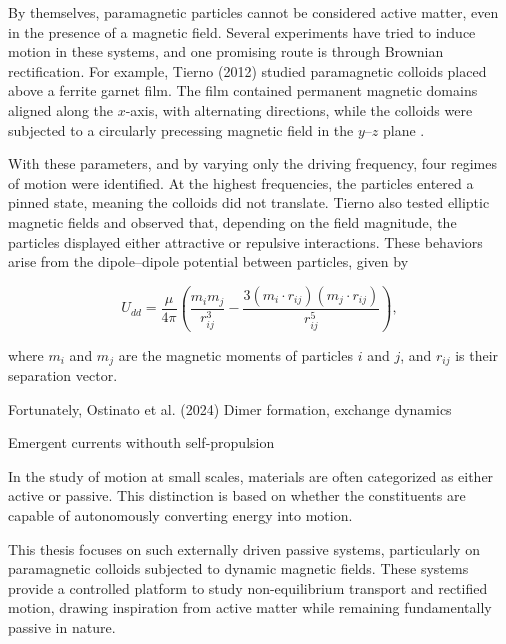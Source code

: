 By themselves, paramagnetic particles cannot be considered active matter, even in the presence of a magnetic field. Several experiments have tried to induce motion in these systems, and one promising route is through Brownian rectification. For example, Tierno (2012) studied paramagnetic colloids placed above a ferrite garnet film. The film contained permanent magnetic domains aligned along the $x$-axis, with alternating directions, while the colloids were subjected to a circularly precessing magnetic field in the $y$–$z$ plane \cite{tierno2012depinning}.

With these parameters, and by varying only the driving frequency, four regimes of motion were identified. At the highest frequencies, the particles entered a pinned state, meaning the colloids did not translate. Tierno also tested elliptic magnetic fields and observed that, depending on the field magnitude, the particles displayed either attractive or repulsive interactions. These behaviors arise from the dipole–dipole potential between particles, given by

\begin{equation}
U_{dd} = \frac{\mu}{4\pi} \left( \frac{m_i m_j}{r^3_{ij}} - \frac{3(m_i \cdot r_{ij})(m_j \cdot r_{ij})}{r^5_{ij}} \right),
\label{eq:dipolepairpotential}
\end{equation}

where $m_i$ and $m_j$ are the magnetic moments of particles $i$ and $j$, and $r_{ij}$ is their separation vector.

Fortunately, Ostinato et al. (2024)
Dimer formation, exchange dynamics

Emergent currents withouth self-propulsion

In the study of motion at small scales, materials are often categorized as either active or passive. This distinction is based on whether the constituents are capable of autonomously converting energy into motion.


This thesis focuses on such externally driven passive systems, particularly on paramagnetic colloids subjected to dynamic magnetic fields. These systems provide a controlled platform to study non-equilibrium transport and rectified motion, drawing inspiration from active matter while remaining fundamentally passive in nature.

\newpage
